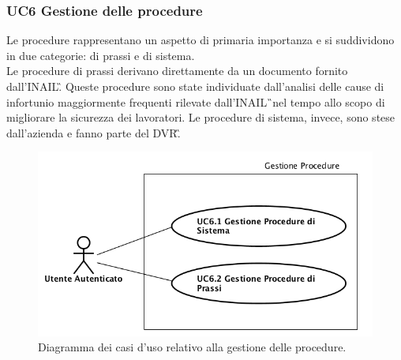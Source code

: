 	\subsubsection{UC6 Gestione delle procedure}
		\label{section:UC6}
		Le procedure rappresentano un aspetto di primaria importanza e si suddividono in due categorie: di prassi e di sistema. \\
		Le procedure di prassi derivano direttamente da un documento fornito dall'\gls{INAIL}\G. Queste procedure sono state individuate dall'analisi delle cause di infortunio maggiormente frequenti rilevate dall'\gls{INAIL}\G\ nel tempo allo scopo di migliorare la sicurezza dei lavoratori.
		Le procedure di sistema, invece, sono stese dall'azienda e fanno parte del \gls{DVR}\G. 
		\begin{figure}[H]
			\begin{center}
				\includegraphics[width=12cm]{Pics/UC6GestioneProcedure.png}
				\caption{Diagramma dei casi d'uso relativo alla gestione delle procedure.}
				\label{fig:UC6_Procedure}
			\end{center}
		\end{figure}
		
